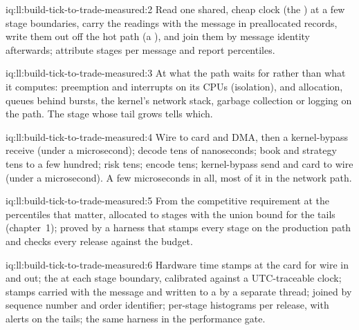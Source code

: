 \begin{solution}{iq:ll:build-tick-to-trade-measured:2}
Read one shared, cheap clock (the ) at a few stage boundaries, carry the readings with the message in
preallocated records, write them out off the hot path (a ), and join them by message identity afterwards; attribute
stages per message and report percentiles.
\end{solution}

\begin{solution}{iq:ll:build-tick-to-trade-measured:3}
At what the path waits for rather than what it computes: preemption and interrupts on its CPUs (isolation),  and
allocation, queues behind bursts, the kernel's network stack, garbage collection or logging on the path. The stage whose tail
grows tells which.
\end{solution}

\begin{solution}{iq:ll:build-tick-to-trade-measured:4}
Wire to card and DMA, then a kernel-bypass receive (under a microsecond); decode tens of nanoseconds; book and strategy tens to a
few hundred; risk tens; encode tens; kernel-bypass send and card to wire (under a microsecond). A few microseconds in all, most of
it in the network path.
\end{solution}

\begin{solution}{iq:ll:build-tick-to-trade-measured:5}
From the competitive requirement at the percentiles that matter, allocated to stages with the union bound for the tails
(chapter~1); proved by a harness that stamps every stage on the production path and checks every release against the budget.
\end{solution}

\begin{solution}{iq:ll:build-tick-to-trade-measured:6}
Hardware time stamps at the card for wire in and out; the  at each stage boundary, calibrated against a
UTC-traceable clock; stamps carried with the message and written to a  by a separate thread; joined by sequence number
and order identifier; per-stage histograms per release, with alerts on the tails; the same harness in the performance gate.
\end{solution}
